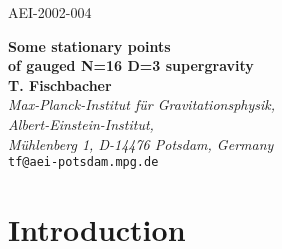 \documentclass[a4paper,12pt]{article}
\begin{document}
\makeatletter
{}
\makeatother
\renewcommand{\theequation}{\thesection.\arabic{equation}}


\def\tr#1{\mbox{tr}\,#1}

\def\cosx#1{{\tt c}{\left(#1\right)}}
\def\coshx#1{{\tt K}{\left(#1\right)}}
\def\sinhx#1{{\tt S}{\left(#1\right)}}
\def\psip#1{\psi^+_{#1}}
\def\psim#1{\psi^-_{#1}}
\def\psipm#1{\psi^\pm_{#1}}

\thispagestyle{empty}
\begin{flushright}
AEI-2002-004
\end{flushright}

\begin{center}
{\bf\Large Some stationary points \\ of gauged N=16 D=3 supergravity}\\
\bigskip\bigskip\bigskip\bigskip
{\bf T. Fischbacher\medskip\\ }
{\em Max-Planck-Institut f\"ur Gravitationsphysik,\\
     Albert-Einstein-Institut,\\
     M\"uhlenberg 1, D-14476 Potsdam, Germany\\ }
\smallskip
{\small \tt tf@aei-potsdam.mpg.de}\bigskip

\end{center}

\begin{abstract}
\noindent Five nontrivial stationary points are found for maximal gauged N=16 supergravity in
three dimensions with gauge group \coordHE{} by restricting
the potential to a submanifold of the space of 
\coordHE{} singlets.
The construction
presented here uses the embedding of \coordHE{} to
lift the analysis of \coordHE{} supergravity performed by N. Warner to
\coordHE{}, and hence, these stationary points correspond to some of
the known extrema of gauged \coordHE{} supergravity.
\end{abstract}

\vfill
{}

\newpage

\section{Introduction}
\end{document}
